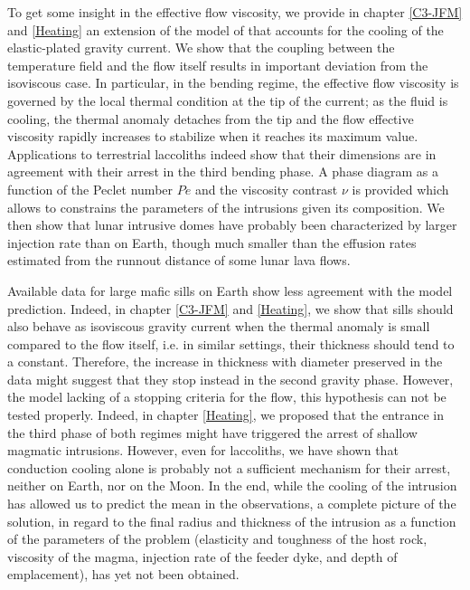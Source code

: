 To get  some insight in  the effective  flow viscosity, we  provide in
chapter \ref{C3-JFM}  and \ref{Heating} an  extension of the  model of
\citet{Michaut:2011kg}   that  accounts   for  the   cooling  of   the
elastic-plated gravity current.  We show that the coupling between the
temperature field and  the flow itself results  in important deviation
from the  isoviscous case. In  particular, in the bending  regime, the
effective flow viscosity is governed by the local thermal condition at
the tip of  the current; as the fluid is  cooling, the thermal anomaly
detaches  from  the  tip  and the  flow  effective  viscosity  rapidly
increases   to  stabilize   when   it  reaches   its  maximum   value.
Applications  to   terrestrial  laccoliths  indeed  show   that  their
dimensions are  in agreement  with their arrest  in the  third bending
phase.  A  phase diagram as a  function of the Peclet  number $Pe$ and
the viscosity  contrast $\nu$ is  provided which allows  to constrains
the parameters of the intrusions  given its composition.  We then show
that lunar intrusive domes have  probably been characterized by larger
injection rate  than on Earth,  though much smaller than  the effusion
rates estimated from the runnout distance of some lunar lava flows.

Available data for large mafic sills on Earth show less agreement with
the   model  prediction.    Indeed,   in   chapter  \ref{C3-JFM}   and
\ref{Heating}, we  show that  sills should  also behave  as isoviscous
gravity current when the thermal anomaly is small compared to the flow
itself, i.e.   in similar settings,  their thickness should tend  to a
constant. Therefore, the increase in thickness with diameter preserved
in the data might suggest that they stop instead in the second gravity
phase. However, the model lacking of a stopping criteria for the flow,
this  hypothesis  can not  be  tested  properly.  Indeed,  in  chapter
\ref{Heating}, we  proposed that  the entrance in  the third  phase of
both  regimes might  have  triggered the  arrest  of shallow  magmatic
intrusions.   However,  even  for   laccoliths,  we  have  shown  that
conduction cooling  alone is probably  not a sufficient  mechanism for
their arrest, neither on Earth, nor on the Moon. In the end, while the
cooling of  the intrusion has  allowed us to  predict the mean  in the
observations, a  complete picture  of the solution,  in regard  to the
final  radius and  thickness of  the intrusion  as a  function of  the
parameters of the problem (elasticity  and toughness of the host rock,
viscosity of the  magma, injection rate of the feeder  dyke, and depth
of emplacement), has yet not been obtained.

